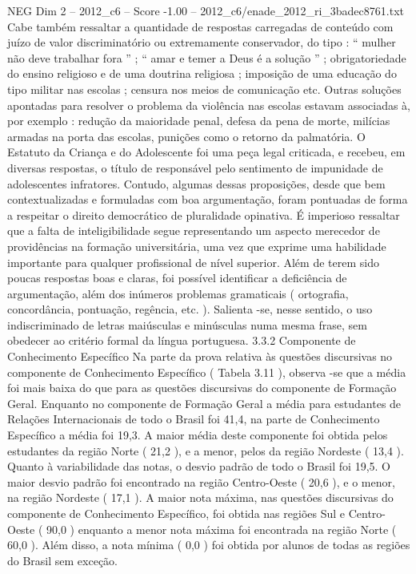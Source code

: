 \begin{textsample}{NEG Dim 2 – 2012\_c6 – Score -1.00 – 2012\_c6/enade\_2012\_ri\_3badec8761.txt}
Cabe também ressaltar a quantidade de respostas carregadas de conteúdo com juízo de valor discriminatório ou extremamente conservador, do tipo : “ mulher não deve trabalhar fora ” ; “ amar e temer a Deus é a solução ” ; obrigatoriedade do ensino religioso e de uma doutrina religiosa ; imposição de uma educação do tipo militar nas escolas ; censura nos meios de comunicação etc.
Outras soluções apontadas para resolver o problema da violência nas escolas estavam associadas à, por exemplo : redução da maioridade penal, defesa da pena de morte, milícias armadas na porta das escolas, punições como o retorno da palmatória.
O Estatuto da Criança e do Adolescente foi uma peça legal criticada, e recebeu, em diversas respostas, o título de responsável pelo sentimento de impunidade de adolescentes infratores.
Contudo, algumas dessas proposições, desde que bem contextualizadas e formuladas com boa argumentação, foram pontuadas de forma a respeitar o direito democrático de pluralidade opinativa.
É imperioso ressaltar que a falta de inteligibilidade segue representando um aspecto merecedor de providências na formação universitária, uma vez que exprime uma habilidade importante para qualquer profissional de nível superior.
Além de terem sido poucas respostas boas e claras, foi possível identificar a deficiência de argumentação, além dos inúmeros problemas gramaticais ( ortografia, concordância, pontuação, regência, etc. ).
Salienta -se, nesse sentido, o uso indiscriminado de letras maiúsculas e minúsculas numa mesma frase, sem obedecer ao critério formal da língua portuguesa. 3.3.2 Componente de Conhecimento Específico Na parte da prova relativa às questões discursivas no componente de Conhecimento Específico ( Tabela 3.11 ), observa -se que a média foi mais baixa do que para as questões discursivas do componente de Formação Geral.
Enquanto no componente de Formação Geral a média para estudantes de Relações Internacionais de todo o Brasil foi 41,4, na parte de Conhecimento Específico a média foi 19,3.
A maior média deste componente foi obtida pelos estudantes da região Norte ( 21,2 ), e a menor, pelos da região Nordeste ( 13,4 ).
Quanto à variabilidade das notas, o desvio padrão de todo o Brasil foi 19,5.
O maior desvio padrão foi encontrado na região Centro-Oeste ( 20,6 ), e o menor, na região Nordeste ( 17,1 ).
A maior nota máxima, nas questões discursivas do componente de Conhecimento Específico, foi obtida nas regiões Sul e Centro-Oeste ( 90,0 ) enquanto a menor nota máxima foi encontrada na região Norte ( 60,0 ).
Além disso, a nota mínima ( 0,0 ) foi obtida por alunos de todas as regiões do Brasil sem exceção.

\end{textsample}
